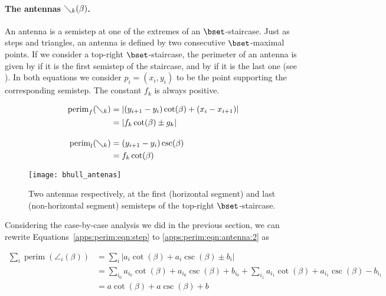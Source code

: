 \documentclass[11pt,letterpaper,english]{article}
\theoremstyle{definition}
\newcommand{\perim}{\operatorname{perim}}
\begin{document}
\paragraph{The antennas $\diagdown_k(\beta)$.}

An antenna is a semistep at one of the extremes of an
$\bset$-staircase. Just as steps and triangles, an antenna is defined
by two consecutive $\bset$-maximal points. If we consider a top-right
$\bset$-staircase, the perimeter of an antenna is given by
 if it is the first semistep of the
staircase, and by  if it is the last one
(see ). In both equations we consider
$p_i=(x_i,y_i)$ to be the point supporting the corresponding
semistep. The constant $f_k$ is always positive.

\begin{align}
  \label{apps:perim:eqn:antenna:1}
  \perim_f(\diagdown_k) &= \left|
                       \left( y_{i+1}-y_i \right)\cot(\beta)
                       + \left( x_i-x_{i+1} \right)
                       \right| \nonumber \\
                     &= \left|
                       f_k \cot(\beta) \pm g_k
                       \right|\\[1em]
  \label{apps:perim:eqn:antenna:2}
  \perim_l(\diagdown_k) &= \left( y_{i+1}-y_i \right)\csc(\beta) \nonumber \\
                     &= f_k \cot(\beta)
\end{align}

\begin{figure}[ht]
  \centering
  \begin{minipage}{0.9\textwidth}
    \centering
    {\texttt{[image: bhull\_antenas]}}
    \caption{Two antennas respectively, at the first (horizontal
      segment) and last (non-horizontal segment) semisteps of the
      top-right $\bset$-staircase.}
    \label{apps:perim:fig:antennas}
  \end{minipage}
\end{figure}

Considering the case-by-case analysis we did in the previous section,
we can rewrite Equations~\ref{apps:perim:eqn:step} to
\ref{apps:perim:eqn:antenna:2} as

\begin{align}
  \label{apps:perim:eqn:antenna:3}
  \sum_i \perim(\angle_i(\beta)) &= \sum_i \left|
                                   a_i \cot(\beta) + a_i \csc(\beta)
                                   \pm  b_i
                                   \right| \nonumber \\
                                 &= \sum_{i_0}
                                   a_{i_0} \cot(\beta) + a_{i_0} \csc(\beta) + b_{i_0}
                                   +  \sum_{i_1}
                                   a_{i_1} \cot(\beta) + a_{i_1} \csc(\beta) - b_{i_1} \nonumber \\
                                 &= a \cot(\beta) + a \csc(\beta) + b
\end{align}
\end{document}
